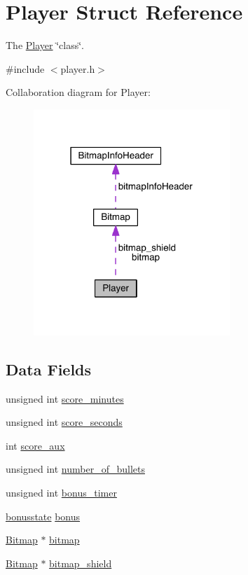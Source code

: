 \hypertarget{struct_player}{}\section{Player Struct Reference}
\label{struct_player}


The \hyperlink{struct_player}{Player} \char`\"{}class\char`\"{}.  




{\ttfamily \#include $<$player.\+h$>$}



Collaboration diagram for Player\+:
\nopagebreak
\begin{figure}[H]
\begin{center}
\leavevmode
\includegraphics[width=210pt]{struct_player__coll__graph}
\end{center}
\end{figure}
\subsection*{Data Fields}
\begin{DoxyCompactItemize}
\item 
unsigned int \hyperlink{struct_player_a9ebf860aa3d67f9f3229afa365dbd2df}{score\+\_\+minutes}
\item 
unsigned int \hyperlink{struct_player_ac5b57794eda52960699e7304de9ed640}{score\+\_\+seconds}
\item 
int \hyperlink{struct_player_aa7c2d82515de928df40dec915c3ba081}{score\+\_\+aux}
\item 
unsigned int \hyperlink{struct_player_a391d726f640974bcd70eeba097a92ebf}{number\+\_\+of\+\_\+bullets}
\item 
unsigned int \hyperlink{struct_player_a0b2f5a7e6b082f9f828b559d165ac60f}{bonus\+\_\+timer}
\item 
\hyperlink{group__player_ga3ab4abfc8d967315be3486178b91d2d9}{bonusstate} \hyperlink{struct_player_ad071f1edf847f7378f6161c02ba70640}{bonus}
\item 
\hyperlink{struct_bitmap}{Bitmap} $\ast$ \hyperlink{struct_player_a00c870e2cedff0b231b1c8ad85019f66}{bitmap}
\item 
\hyperlink{struct_bitmap}{Bitmap} $\ast$ \hyperlink{struct_player_adb5f5a8861d7950622a415e122e4e6d7}{bitmap\+\_\+shield}
\end{DoxyCompactItemize}


